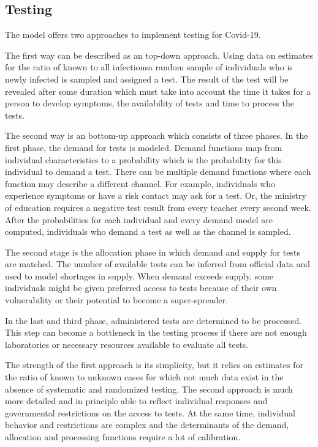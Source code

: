 \subsection{Testing} %
\label{sub:testing}

The model offers two approaches to implement testing for Covid-19.

The first way can be described as an top-down approach. Using data on estimates for the ratio of known to all infections\footnotemark a random sample of individuals who is newly infected is sampled and assigned a test. The result of the test will be revealed after some duration which must take into account the time it takes for a person to develop symptoms, the availability of tests and time to process the tests.


The second way is an bottom-up approach which consists of three phases. In the first phase, the demand for tests is modeled. Demand functions map from individual characteristics to a probability which is the probability for this individual to demand a test. There can be multiple demand functions where each function may describe a different channel. For example, individuals who experience symptoms or have a risk contact may ask for a test. Or, the ministry of education requires a negative test result from every teacher every second week. After the probabilities for each individual and every demand model are computed, individuals who demand a test as well as the channel is sampled.

The second stage is the allocation phase in which demand and supply for tests are matched. The number of available tests can be inferred from official data and used to model shortages in supply. When demand exceeds supply, some individuals might be given preferred access to tests because of their own vulnerability or their potential to become a super-spreader.

In the last and third phase, administered tests are determined to be processed. This step can become a bottleneck in the testing process if there are not enough laboratories or necessary resources available to evaluate all tests.

The strength of the first approach is its simplicity, but it relies on estimates for the ratio of known to unknown cases for which not much data exist in the absence of systematic and randomized testing. The second approach is much more detailed and in principle able to reflect individual responses and governmental restrictions on the access to tests. At the same time, individual behavior and restrictions are complex and the determinants of the demand, allocation and processing functions require a lot of calibration.

